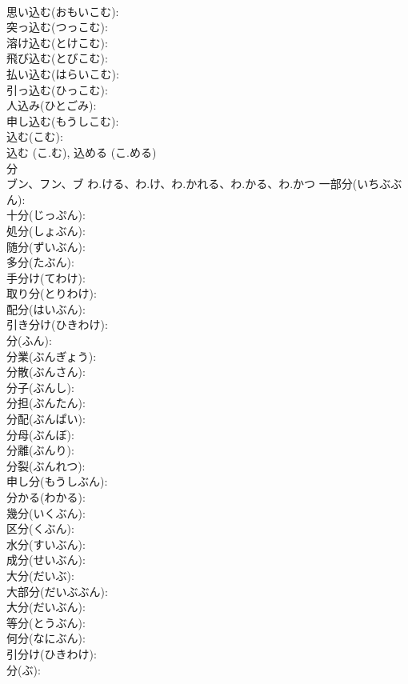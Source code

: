 \documentclass[8pt]{extreport}
\begin{document}
\begin{CJK}{UTF8}{min}
\\	思い込む(おもいこむ): 
\\	突っ込む(つっこむ): 
\\	溶け込む(とけこむ): 
\\	飛び込む(とびこむ): 
\\	払い込む(はらいこむ): 
\\	引っ込む(ひっこむ): 
\\	人込み(ひとごみ): 
\\	申し込む(もうしこむ): 
\\	込む(こむ): 
\\	込む (こ.む), 込める (こ.める)
\\	分			
\\	ブン、フン、ブ	わ.ける、わ.け、わ.かれる、わ.かる、わ.かつ	一部分(いちぶぶん): 
\\	十分(じっぷん): 
\\	処分(しょぶん): 
\\	随分(ずいぶん): 
\\	多分(たぶん): 
\\	手分け(てわけ): 
\\	取り分(とりわけ): 
\\	配分(はいぶん): 
\\	引き分け(ひきわけ): 
\\	分(ふん): 
\\	分業(ぶんぎょう): 
\\	分散(ぶんさん): 
\\	分子(ぶんし): 
\\	分担(ぶんたん): 
\\	分配(ぶんぱい): 
\\	分母(ぶんぼ): 
\\	分離(ぶんり): 
\\	分裂(ぶんれつ): 
\\	申し分(もうしぶん): 
\\	分かる(わかる): 
\\	幾分(いくぶん): 
\\	区分(くぶん): 
\\	水分(すいぶん): 
\\	成分(せいぶん): 
\\	大分(だいぶ): 
\\	大部分(だいぶぶん): 
\\	大分(だいぶん): 
\\	等分(とうぶん): 
\\	何分(なにぶん): 
\\	引分け(ひきわけ): 
\\	分(ぶ): 

\end{CJK}
\end{document}
